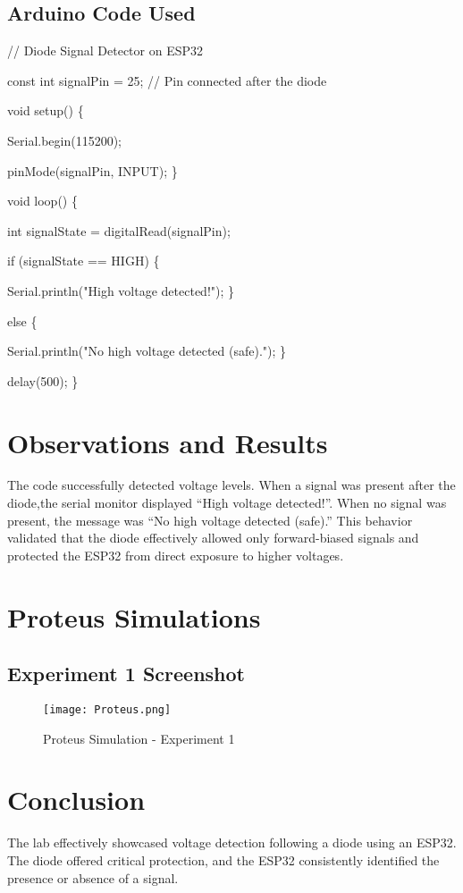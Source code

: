 \documentclass{article}
\begin{document}
\subsection{Arduino Code Used}

\item // Diode Signal Detector on ESP32
\item const int signalPin = 25; // Pin connected after the diode
\item void setup()
  \{
\item Serial.begin(115200);
\item pinMode(signalPin, INPUT);
 \}
\item void loop()
  \{
\item int signalState = digitalRead(signalPin);
\item if (signalState == HIGH)
 \{
\item Serial.println("High voltage detected!");
\}
\item else
  \{
\item Serial.println("No high voltage detected (safe).");
\}
\item delay(500);
\}


\section{Observations and Results}
The code successfully detected voltage levels. When a signal was present after the diode,the serial monitor displayed “High voltage detected!”. When no signal was present, the message was “No high voltage detected (safe).”
This behavior validated that the diode effectively allowed only forward-biased signals and protected the ESP32 from direct exposure to higher voltages.

\newpage

\section{ Proteus Simulations}
\subsection{ Experiment 1 Screenshot}
\begin{figure}[h]
    \centering
    \texttt{[image: Proteus.png]}
    \caption{Proteus Simulation - Experiment 1}
    \label{fig:image}
\end{figure}

\section{Conclusion}
The lab effectively showcased voltage detection following a diode using an ESP32. The diode offered critical protection, and the ESP32 consistently identified the presence or absence of a signal.
\end{document}
